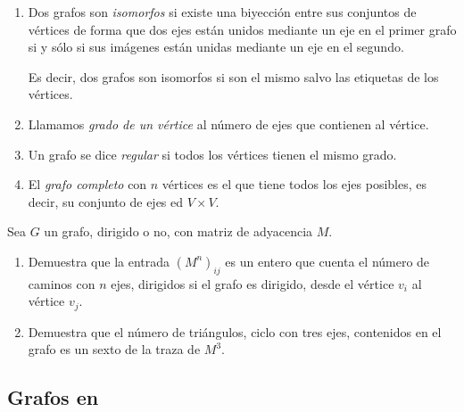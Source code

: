 \begin{enumerate}
 \item Dos grafos son {\itshape isomorfos} si existe una biyecci\'on entre sus 
conjuntos de v\'ertices de forma que dos ejes est\'an unidos mediante un eje en 
el primer grafo si y s\'olo si sus im\'agenes est\'an unidas mediante un eje en 
el segundo.


Es decir, dos grafos son isomorfos si son el mismo salvo las etiquetas de los 
v\'ertices. 

\item Llamamos {\itshape grado de un v\'ertice} al n\'umero de ejes que 
contienen al v\'ertice. 

\item Un grafo se dice {\itshape regular} si todos los v\'ertices tienen el 
mismo grado. 

\item El {\itshape grafo completo} con $n$ v\'ertices es el que tiene todos los 
ejes posibles, es decir, su conjunto de ejes ed $V\times V.$

\end{enumerate}

\begin{ejer}
 Sea $G$ un grafo, dirigido o no, con matriz de adyacencia $M$. 
 \begin{enumerate}
  \item Demuestra que la entrada $(M^n)_{ij}$ es un entero que cuenta el 
n\'umero de caminos con $n$ ejes, dirigidos si el grafo es dirigido, desde el 
v\'ertice $v_i$ 
al v\'ertice $v_j$.

\item Demuestra que el n\'umero de tri\'angulos, ciclo con tres ejes,  
contenidos en el grafo  es 
   un sexto de la traza de $M^3$.
  
 \end{enumerate}
 \end{ejer}



\subsection{Grafos en {\sage}}

